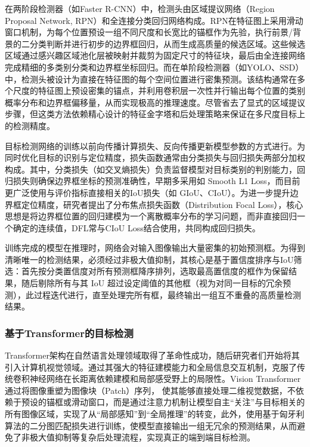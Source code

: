在两阶段检测器（如Faster R-CNN）中，检测头由区域提议网络（Region Proposal Network, RPN）和全连接分类回归网络构成。RPN在特征图上采用滑动窗口机制，为每个位置预设一组不同尺度和长宽比的锚框作为先验，执行前景/背景的二分类判断并进行初步的边界框回归，从而生成高质量的候选区域。这些候选区域通过感兴趣区域池化层被映射并裁剪为固定尺寸的特征块，最后由全连接网络完成精细的多类别分类和边界框坐标回归。而在单阶段检测器（如YOLO、SSD）中，检测头被设计为直接在特征图的每个空间位置进行密集预测。该结构通常在多个尺度的特征图上预设密集的锚点，并利用卷积层一次性并行输出每个位置的类别概率分布和边界框偏移量，从而实现极高的推理速度。尽管省去了显式的区域提议步骤，但这类方法依赖精心设计的特征金字塔和后处理策略来保证在多尺度目标上的检测精度。

目标检测网络的训练以前向传播计算损失、反向传播更新模型参数的方式进行。为同时优化目标的识别与定位精度，损失函数通常由分类损失与回归损失两部分加权构成。其中，分类损失（如交叉熵损失）负责监督模型对目标类别的判别能力，回归损失则确保边界框坐标的预测准确性，早期多采用如 Smooth L1 Loss，而目前更广泛使用与评价指标直接相关的IoU损失（如 GIoU\cite{Rezatofighi2019GIOU}、CIoU\cite{Zheng2022CIoU}）。为进一步提升边界框定位精度，研究者提出了分布焦点损失函数（Distribution Focal Loss\cite{Li2023DFL}），核心思想是将边界框位置的回归建模为一个离散概率分布的学习问题，而非直接回归一个确定的连续值，DFL常与CIoU Loss结合使用，共同构成回归损失。

训练完成的模型在推理时，网络会对输入图像输出大量密集的初始预测框。为得到清晰唯一的检测结果，必须经过非极大值抑制，其核心是基于置信度排序与IoU筛选：首先按分类置信度对所有预测框降序排列，选取最高置信度的框作为保留结果，随后剔除所有与其 IoU 超过设定阈值的其他框（视为对同一目标的冗余预测），此过程迭代进行，直至处理完所有框，最终输出一组互不重叠的高质量检测结果。


\subsubsection{基于Transformer的目标检测} 
Transformer架构在自然语言处理领域取得了革命性成功，随后研究者们开始将其引入计算机视觉领域\cite{FKTC202402008}。通过其强大的特征建模能力和全局信息交互机制，克服了传统卷积神经网络在长距离依赖建模和局部感受野上的局限性。Vision Transformer通过将图像重塑为图像块（Patch）序列， 使其能够直接处理二维视觉数据，不依赖于预设的锚框或滑动窗口，而是通过注意力机制让模型自主“关注”与目标相关的所有图像区域，实现了从“局部感知”到“全局推理”的转变，此外，使用基于匈牙利算法的二分图匹配损失进行训练，使模型直接输出一组无冗余的预测结果，从而避免了非极大值抑制等复杂后处理流程，实现真正的端到端目标检测。


